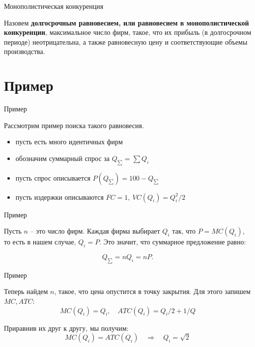 \documentclass{beamer}
\begin{document}
\begin{frame}{Монополистическая конкуренция}

\begin{definition}
Назовем \textbf{долгосрочным равновесием, или равновесием в монополистической конкуренции}, максимальное число фирм, такое, что их прибыль (в долгосрочном периоде) неотрицательна, а также равновесную цену и соответствующие объемы производства.
\end{definition}

\end{frame}

\section{Пример}

\begin{frame}{Пример}

Рассмотрим пример поиска такого равновесия.

\begin{itemize}
\item пусть есть много идентичных фирм
\item обозначим суммарный спрос за $Q_{\sum} = \sum Q_i$
\item пусть спрос описывается $P(Q_{\sum}) = 100 - Q_{\sum}$
\item пусть издержки описываются $FC = 1, \ VC(Q_i) = Q_i^2/2$
\end{itemize}

\end{frame}

\begin{frame}{Пример}

Пусть $n$ – это число фирм. Каждая фирма выбирает $Q_i$ так, что $P = MC(Q_i)$, то есть в нашем случае, $Q_i = P$. Это значит, что суммарное предложение равно: 

$$Q_{\sum} = n Q_i = n P.$$

\end{frame}

\begin{frame}{Пример}

Теперь найдем $n$, такое, что цена опустится в точку закрытия. Для этого запишем $MC, ATC$:
$$ MC(Q_i) = Q_i, \quad ATC(Q_i) = Q_i/2 + 1/Q$$

Приравнив их друг к другу, мы получим:
$$ MC(Q_i) = ATC(Q_i) \quad \Rightarrow \quad Q_i = \sqrt{2}$$

\end{frame}
\end{document}

